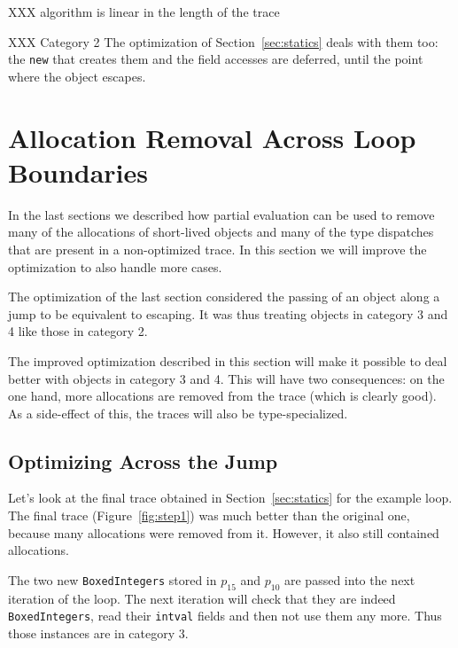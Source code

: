 \documentclass{sigplanconf}
\begin{document}
XXX algorithm is linear in the length of the trace

XXX Category 2 The optimization of
Section~\ref{sec:statics} deals with them too: the \texttt{new} that creates them and
the field accesses are deferred, until the point where the object escapes.






\section{Allocation Removal Across Loop Boundaries}
\label{sec:crossloop}

In the last sections we described how partial evaluation can be used to remove
many of the allocations of short-lived objects and many of the type dispatches
that are present in a non-optimized trace. In this section we will improve the
optimization to also handle more cases.

The optimization of the last section considered the passing of an object along a
jump to be equivalent to escaping. It was thus treating objects in category 3
and 4 like those in category 2.

The improved optimization described in this section will make it possible to deal
better with objects in category 3 and 4. This will have two consequences: on
the one hand, more allocations are removed from the trace (which is clearly
good). As a side-effect of this, the traces will also be type-specialized.



\subsection{Optimizing Across the Jump}


Let's look at the final trace obtained in Section~\ref{sec:statics} for the
example loop. The final trace (Figure~\ref{fig:step1}) was much better than the
original one, because many allocations were removed from it. However, it also
still contained allocations.

The two new \texttt{BoxedIntegers} stored in $p_{15}$ and $p_{10}$ are passed into
the next iteration of the loop. The next iteration will check that they are
indeed \texttt{BoxedIntegers}, read their \texttt{intval} fields and then not use them
any more. Thus those instances are in category 3.
\end{document}
